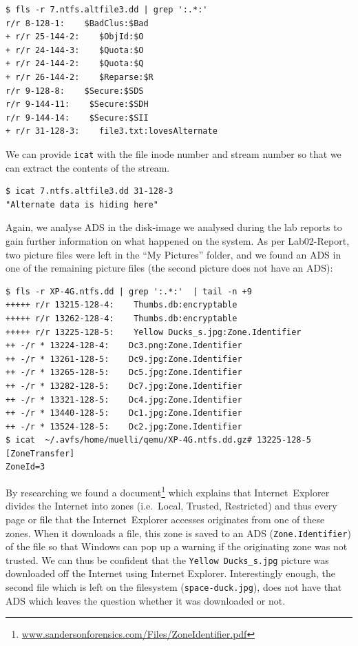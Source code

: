 \documentclass[a4paper,
    11pt,
    normalheadings,
    parindent,
    UKenglish,
    abstracton,
    ]{scrartcl}
\begin{document}
\begin{verbatim}
$ fls -r 7.ntfs.altfile3.dd | grep ':.*:'
r/r 8-128-1:    $BadClus:$Bad
+ r/r 25-144-2:    $ObjId:$O
+ r/r 24-144-3:    $Quota:$O
+ r/r 24-144-2:    $Quota:$Q
+ r/r 26-144-2:    $Reparse:$R
r/r 9-128-8:    $Secure:$SDS
r/r 9-144-11:    $Secure:$SDH
r/r 9-144-14:    $Secure:$SII
+ r/r 31-128-3:    file3.txt:lovesAlternate
\end{verbatim}

We can provide \texttt{icat} with the file inode number and stream number so that we can extract the contents of the stream.

\begin{verbatim}
$ icat 7.ntfs.altfile3.dd 31-128-3
"Alternate data is hiding here"
\end{verbatim}

Again, we analyse ADS in the disk-image we analysed during the lab reports to gain further information on what happened on the system.
As per Lab02-Report, two picture files were left in the ``My Pictures'' folder, and we found an ADS in one of the remaining picture files (the second picture does not have an ADS):
\begin{verbatim}
$ fls -r XP-4G.ntfs.dd | grep ':.*:'  | tail -n +9
+++++ r/r 13215-128-4:    Thumbs.db:encryptable
+++++ r/r 13262-128-4:    Thumbs.db:encryptable
+++++ r/r 13225-128-5:    Yellow Ducks_s.jpg:Zone.Identifier
++ -/r * 13224-128-4:    Dc3.png:Zone.Identifier
++ -/r * 13261-128-5:    Dc9.jpg:Zone.Identifier
++ -/r * 13265-128-5:    Dc5.jpg:Zone.Identifier
++ -/r * 13282-128-5:    Dc7.jpg:Zone.Identifier
++ -/r * 13321-128-5:    Dc4.jpg:Zone.Identifier
++ -/r * 13440-128-5:    Dc1.jpg:Zone.Identifier
++ -/r * 13524-128-5:    Dc2.jpg:Zone.Identifier
$ icat  ~/.avfs/home/muelli/qemu/XP-4G.ntfs.dd.gz# 13225-128-5
[ZoneTransfer]
ZoneId=3
\end{verbatim}
By researching we found a document\footnote{\url{www.sandersonforensics.com/Files/ZoneIdentifier.pdf}} which explains that Internet~Explorer divides the Internet into zones (i.e.\, Local, Trusted, Restricted) and thus every page or file that the Internet~Explorer accesses originates from one of these zones.
When it downloads a file, this zone is saved to an ADS (\texttt{Zone.Identifier}) of the file so that Windows can pop up a warning if the originating zone was not trusted.
We can thus be confident that the \texttt{Yellow Ducks\_s.jpg} picture was downloaded off the Internet using Internet Explorer.
Interestingly enough, the second file which is left on the filesystem (\texttt{space-duck.jpg}), does not have that ADS which leaves the question whether it was downloaded or not.
\end{document}
